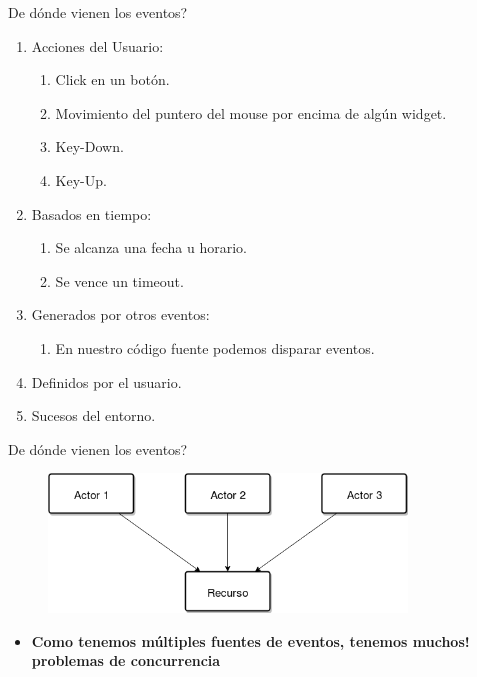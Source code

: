 \begin{frame}{\textquestiondown De d\'onde vienen los eventos?}{
}

  \begin{enumerate}

    \item Acciones del Usuario:
    \begin{enumerate}
      \item Click en un bot\'on.
      \item Movimiento del puntero del mouse por encima de alg\'un widget.
      \item Key-Down.
      \item Key-Up.
    \end{enumerate}

    \item Basados en tiempo:
    \begin{enumerate}
      \item Se alcanza una fecha u horario.
      \item Se vence un timeout.
    \end{enumerate}

    \item Generados por otros eventos:
    \begin{enumerate}
      \item En nuestro c\'odigo fuente podemos disparar eventos.
    \end{enumerate}

    \item Definidos por el usuario.

    \item Sucesos del entorno.

  \end{enumerate}

\end{frame}

\begin{frame}{\textquestiondown De d\'onde vienen los eventos?}{
}

  \begin{figure}
    \centering
    \includegraphics[width=0.85\textwidth]{./producers_only.png}
  \end{figure}
  
  \begin{itemize}
    \item \textbf{Como tenemos m\'ultiples fuentes de eventos, tenemos \textexclamdown muchos! problemas de concurrencia}
  \end{itemize}

\end{frame}


